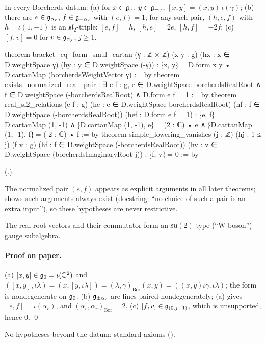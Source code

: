 \begin{theorem}\label{ch18:thm:bdbasic}
In every Borcherds datum: (a) for $x\in\mathfrak{g}_\gamma$, $y\in\mathfrak{g}_{-\gamma}$, $[x,y]=(x,y)\,\iota(\gamma)$; (b) there are $e\in\mathfrak{g}_{\alpha_r}$,
$f\in\mathfrak{g}_{-\alpha_r}$ with $(e,f)=1$; for any such pair, $(h,e,f)$ with $h=\iota(1,-1)$ is an $\mathfrak{sl}_2$-triple:
$[e,f]=h$, $[h,e]=2e$, $[h,f]=-2f$; (c) $[f,v]=0$ for $v\in\mathfrak{g}_{\alpha_j}$, $j\ge1$.
\end{theorem}
\begin{leancode}
theorem bracket_eq_form_smul_cartan (γ : ℤ × ℤ) (x y : g)
    (hx : x ∈ D.weightSpace γ) (hy : y ∈ D.weightSpace (-γ)) :
    ⁅x, y⁆ = D.form x y • D.cartanMap (borcherdsWeightVector γ) := by
theorem exists_normalized_real_pair : ∃ e f : g,
    e ∈ D.weightSpace borcherdsRealRoot ∧ f ∈ D.weightSpace (-borcherdsRealRoot) ∧
      D.form e f = 1 := by
theorem real_sl2_relations (e f : g)
    (he : e ∈ D.weightSpace borcherdsRealRoot)
    (hf : f ∈ D.weightSpace (-borcherdsRealRoot)) (hef : D.form e f = 1) :
    ⁅e, f⁆ = D.cartanMap (1, -1) ∧
      ⁅D.cartanMap (1, -1), e⁆ = (2 : ℂ) • e ∧
      ⁅D.cartanMap (1, -1), f⁆ = (-2 : ℂ) • f := by
theorem simple_lowering_vanishes (j : ℤ) (hj : 1 ≤ j) (f v : g)
    (hf : f ∈ D.weightSpace (-borcherdsRealRoot))
    (hv : v ∈ D.weightSpace (borcherdsImaginaryRoot j)) : ⁅f, v⁆ = 0 := by
\end{leancode}
(.)
\begin{dictionary}
The normalized pair $(e,f)$ appears as explicit arguments  in
all later theorems;  shows such arguments always exist (docstring: ``no choice
of such a pair is an extra input''), so these hypotheses are never restrictive.
\end{dictionary}
\begin{physics}The real root vectors and their commutator form an $\mathfrak{su}(2)$-type (``W-boson'') gauge subalgebra.\end{physics}
\paragraph{Proof on paper.}  (a) $[x,y]\in\mathfrak{g}_0=\iota(\mathbb C^2)$ and $([x,y],\iota\lambda)=(x,[y,\iota\lambda])=(\lambda,\gamma)_{\mathrm{Bor}}(x,y)=((x,y)\iota\gamma,\iota\lambda)$;
the form is nondegenerate on $\mathfrak{g}_0$.  (b) $\mathfrak{g}_{\pm\alpha_r}$ are lines paired nondegenerately; (a) gives $[e,f]=\iota(\alpha_r)$, and
$(\alpha_r,\alpha_r)_{\mathrm{Bor}}=2$.  (c) $[f,v]\in\mathfrak{g}_{(0,j+1)}$, which is unsupported, hence $0$. \qed
\begin{status}No hypotheses beyond the datum; standard axioms ().\end{status}

